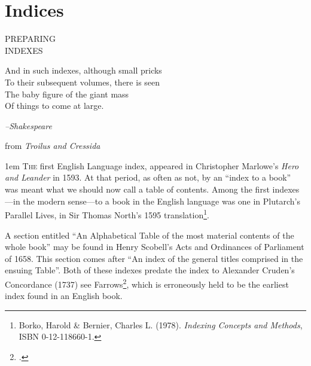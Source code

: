 \let\bs\textbackslash
\parskip1.5pt 


\chapter{Indices}
\pagebreak

\thispagestyle{empty}
    \begin{leftcolumn}
       \begin{center} 
          \huge \noindent PREPARING\\
                   INDEXES
       \end{center}
     
      \medskip

       {\justifying \small\noindent And in such indexes, although small pricks\\
To their subsequent volumes, there is seen\\
The baby figure of the giant mass\\
Of things to come at large. \par
\hfill \textit{--Shakespeare}\par
\hfill\hfill{ \RaggedRight from \textit{Troilus and Cressida}}}
\medskip
       \par
   \end{leftcolumn}
   \begin{rightcolumn}
      \begin{multicols}{2}
        
\parindent1em      \lettrine{T}{he} first English Language index, appeared in Christopher Marlowe's \textit{Hero and Leander} in 1593. At that period, as often as not, by an ``index to a book'' was meant what we should now call a table of contents. Among the first indexes---in the modern sense---to a book in the English language was one in Plutarch's Parallel Lives, in Sir Thomas North's 1595 translation\footnote{Borko, Harold \& Bernier, Charles L. (1978). \textit{Indexing Concepts and Methods}, ISBN 0-12-118660-1.}.  

A section entitled ``An Alphabetical Table of the most material contents of the whole book'' may be found in Henry Scobell's Acts and Ordinances of Parliament of 1658. This section comes after ``An index of the general titles comprised in the ensuing Table''. Both of these indexes predate the index to Alexander Cruden's Concordance (1737) see Farrows\footcite{farrow96}, which is erroneously held to be the earliest index found in an English book.

      \end{multicols}
   \end{rightcolumn}
